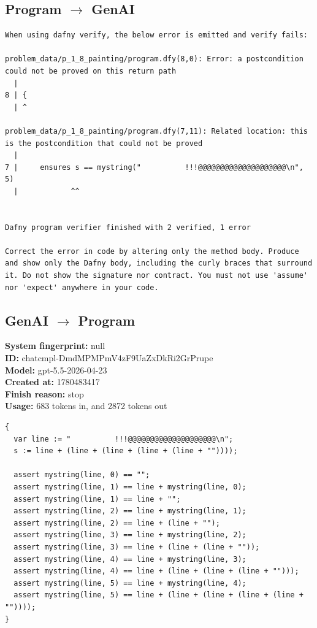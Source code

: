 \documentclass{article}
\begin{document}
\subsection*{Program $\rightarrow$ GenAI}
\begin{lstlisting}
When using dafny verify, the below error is emitted and verify fails:

problem_data/p_1_8_painting/program.dfy(8,0): Error: a postcondition could not be proved on this return path
  |
8 | {
  | ^

problem_data/p_1_8_painting/program.dfy(7,11): Related location: this is the postcondition that could not be proved
  |
7 | 	ensures s == mystring("          !!!@@@@@@@@@@@@@@@@@@@@\n", 5)
  |            ^^


Dafny program verifier finished with 2 verified, 1 error

Correct the error in code by altering only the method body. Produce and show only the Dafny body, including the curly braces that surround it. Do not show the signature nor contract. You must not use 'assume' nor 'expect' anywhere in your code.
\end{lstlisting}
\subsection*{GenAI $\rightarrow$ Program}
\textbf{System fingerprint: }null
\\\textbf{ID: }chatcmpl-DmdMPMPmV4zF9UaZxDkRi2GrPrupe
\\\textbf{Model: }gpt-5.5-2026-04-23
\\\textbf{Created at: }1780483417
\\\textbf{Finish reason: }stop
\\\textbf{Usage: }683 tokens in, and 2872 tokens out
\begin{lstlisting}
{
  var line := "          !!!@@@@@@@@@@@@@@@@@@@@\n";
  s := line + (line + (line + (line + (line + ""))));

  assert mystring(line, 0) == "";
  assert mystring(line, 1) == line + mystring(line, 0);
  assert mystring(line, 1) == line + "";
  assert mystring(line, 2) == line + mystring(line, 1);
  assert mystring(line, 2) == line + (line + "");
  assert mystring(line, 3) == line + mystring(line, 2);
  assert mystring(line, 3) == line + (line + (line + ""));
  assert mystring(line, 4) == line + mystring(line, 3);
  assert mystring(line, 4) == line + (line + (line + (line + "")));
  assert mystring(line, 5) == line + mystring(line, 4);
  assert mystring(line, 5) == line + (line + (line + (line + (line + ""))));
}
\end{lstlisting}
\end{document}

